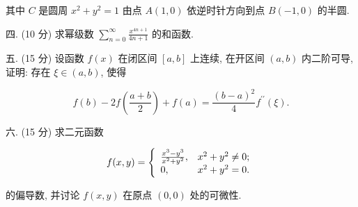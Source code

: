 \documentclass{examcollection}
\renewcommand{\displayformula}[1]{\[#1\]}
\begin{document}
{\begin{minipage}{\textwidth}
其中 $C$ 是圆周 $x^{2} + y^{2} = 1$ 由点 $A(1,0)$ 依逆时针方向到点 $B(-1,0)$ 的半圆.\par
四. (10 分) 求幂级数 $\sum_{n=0}^{\infty} \frac{x^{4n+1}}{4n+1}$ 的和函数.\par
五. (15 分) 设函数 $f(x)$ 在闭区间 $[a, b]$ 上连续, 在开区间 $(a, b)$ 内二阶可导, 证明: 存在 $\xi \in (a, b)$, 使得\par
\displayformula{f (b) - 2 f \left(\frac {a + b}{2}\right) + f (a) = \frac {(b - a) ^ {2}}{4} f ^ {\prime \prime} (\xi).}\par
六. (15 分) 求二元函数\par
\displayformula{f (x, y) = \left\{ \begin{array}{l l} \frac {x ^ {3} - y ^ {3}}{x ^ {2} + y ^ {2}}, & x ^ {2} + y ^ {2} \neq 0; \\ 0, & x ^ {2} + y ^ {2} = 0. \end{array} \right.}\par
的偏导数, 并讨论 $f(x,y)$ 在原点 $(0,0)$ 处的可微性.\par
\end{minipage}}
\ifdim\dimexpr\ht\proofbox+\dp\proofbox\relax>\textheight
\noindent\resizebox{!}{\textheight}{\usebox{\proofbox}}\else\noindent\usebox{\proofbox}\fi\clearpage
\end{document}
